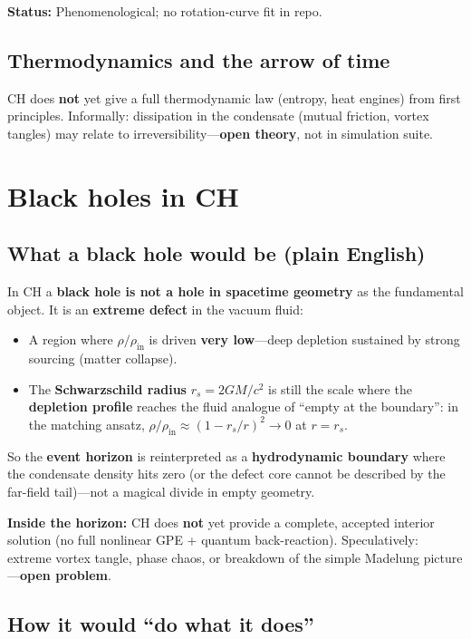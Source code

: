 \documentclass[11pt,a4paper]{article}
\begin{document}
\textbf{Status:} Phenomenological; no rotation-curve fit in repo.

\subsection{Thermodynamics and the arrow of time}

CH does \textbf{not} yet give a full thermodynamic law (entropy, heat engines) from first principles.
Informally: dissipation in the condensate (mutual friction, vortex tangles) may relate to irreversibility---\textbf{open theory}, not in simulation suite.

\section{Black holes in CH}
\label{sec:bh}

\subsection{What a black hole would be (plain English)}

In CH a \textbf{black hole is not a hole in spacetime geometry} as the fundamental object.
It is an \textbf{extreme defect} in the vacuum fluid:
\begin{itemize}[leftmargin=*]
  \item A region where $\rho/\rho_{\mathrm{in}}$ is driven \textbf{very low}---deep depletion sustained by strong sourcing (matter collapse).
  \item The \textbf{Schwarzschild radius} $r_s = 2GM/c^2$ is still the scale where the \textbf{depletion profile} reaches the fluid analogue of ``empty at the boundary'': in the matching ansatz, $\rho/\rho_{\mathrm{in}} \approx (1 - r_s/r)^2 \to 0$ at $r = r_s$.
\end{itemize}

So the \textbf{event horizon} is reinterpreted as a \textbf{hydrodynamic boundary} where the condensate density hits zero (or the defect core cannot be described by the far-field tail)---not a magical divide in empty geometry.

\textbf{Inside the horizon:} CH does \textbf{not} yet provide a complete, accepted interior solution (no full nonlinear GPE + quantum back-reaction).
Speculatively: extreme vortex tangle, phase chaos, or breakdown of the simple Madelung picture---\textbf{open problem}.

\subsection{How it would ``do what it does''}
\end{document}
